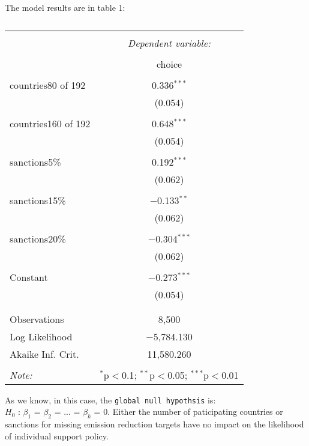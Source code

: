 \documentclass[12pt,letterpaper]{article}
\begin{document}
\begin{enumerate}
\noindent The model results are in table 1:
\begin{table}[!htbp] \centering   \caption{}   \label{} \begin{tabular}{@{\extracolsep{5pt}}lc} \\[-1.8ex]\hline \hline \\[-1.8ex]  & \multicolumn{1}{c}{\textit{Dependent variable:}} \\ \cline{2-2} \\[-1.8ex] & choice \\ \hline \\[-1.8ex]  countries80 of 192 & 0.336$^{***}$ \\   & (0.054) \\   & \\  countries160 of 192 & 0.648$^{***}$ \\   & (0.054) \\   & \\  sanctions5\% & 0.192$^{***}$ \\   & (0.062) \\   & \\  sanctions15\% & $-$0.133$^{**}$ \\   & (0.062) \\   & \\  sanctions20\% & $-$0.304$^{***}$ \\   & (0.062) \\   & \\  Constant & $-$0.273$^{***}$ \\   & (0.054) \\   & \\ \hline \\[-1.8ex] Observations & 8,500 \\ Log Likelihood & $-$5,784.130 \\ Akaike Inf. Crit. & 11,580.260 \\ \hline \hline \\[-1.8ex] \textit{Note:}  & \multicolumn{1}{r}{$^{*}$p$<$0.1; $^{**}$p$<$0.05; $^{***}$p$<$0.01} \\ \end{tabular} \end{table} 
\newpage
\noindent As we know, in this case, the \texttt{global null hypothsis} is:\\ $H_0$ : $\beta_1$ = $\beta_2$ = ... = $\beta_k$ = 0. Either the number of paticipating countries or sanctions for missing emission reduction targets have no impact on the likelihood of individual support policy.


\end{enumerate}
\end{document}
